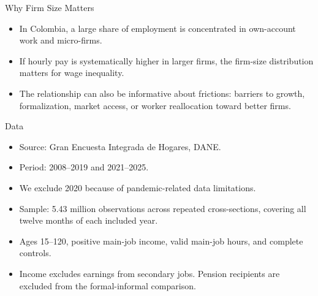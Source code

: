 \begin{frame}{Why Firm Size Matters}

  \vspace{0.35cm}
  \begin{itemize}
    \item In Colombia, a large share of employment is concentrated in own-account work and micro-firms.
    \item If hourly pay is systematically higher in larger firms, the firm-size distribution matters for wage inequality.
    \item The relationship can also be informative about frictions: barriers to growth, formalization, market access, or worker reallocation toward better firms.
  \end{itemize}
\end{frame}

\begin{frame}{Data}

  \vspace{0.3cm}
  \begin{itemize}
    \item Source: Gran Encuesta Integrada de Hogares, DANE.
    \item Period: 2008--2019 and 2021--2025.
    \item We exclude 2020 because of pandemic-related data limitations.
    \item Sample: 5.43 million observations across repeated cross-sections, covering all twelve months of each included year.
    \item Ages 15--120, positive main-job income, valid main-job hours, and complete controls.
    \item Income excludes earnings from secondary jobs. Pension recipients are excluded from the formal-informal comparison.
  \end{itemize}
\end{frame}

